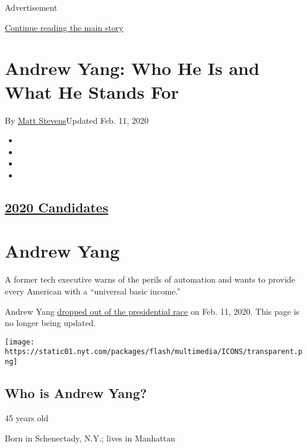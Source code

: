 Advertisement

\protect\hyperlink{after-top}{Continue reading the main story}

\hypertarget{andrew-yang-who-he-is-and-what-he-stands-for}{%
\section{Andrew Yang: Who He Is and What He Stands
For}\label{andrew-yang-who-he-is-and-what-he-stands-for}}

By \href{https://www.nytimes.com/by/matt-stevens}{Matt Stevens}Updated
Feb. 11, 2020

\begin{itemize}
\item
\item
\item
\item
\end{itemize}

\hypertarget{2020-candidates}{%
\subsection{\texorpdfstring{\href{https://www.nytimes.com/interactive/2019/us/politics/2020-presidential-candidates.html}{2020
Candidates}}{2020 Candidates}}\label{2020-candidates}}

\hypertarget{andrew-yang}{%
\section{Andrew Yang}\label{andrew-yang}}

A former tech executive warns of the perils of automation and wants to
provide every American with a ``universal basic income.''

Andrew Yang
\href{http://www.nytimes.com/2020/02/11/us/politics/andrew-yang-drops-out.html}{dropped
out of the presidential race} on Feb. 11, 2020. This page is no longer
being updated.

\texttt{[image: https://static01.nyt.com/packages/flash/multimedia/ICONS/transparent.png]}

\hypertarget{who-is-andrew-yang}{%
\subsection{Who is Andrew Yang?}\label{who-is-andrew-yang}}

45 years old

Born in Schenectady, N.Y.; lives in Manhattan

